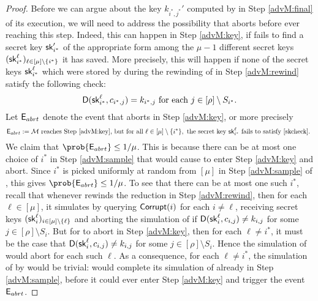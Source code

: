 \begin{proof}
  Before we can argue about the key \(k_{i^{*},j^{*}}'\) computed by
  \redM in Step \ref{advM:final} of its execution,
  we will need to address the possibility that \redM aborts
  before ever reaching this step.
  Indeed, this can happen in Step \ref{advM:key},
  if \redM fails to find a secret key \(\mathsf{sk}_{i^{*}}'\)
  of the appropriate form among the \(\mu - 1\)
  different secret keys \((\mathsf{sk}_{i^{*}}^{\ell})_{\ell \in [\mu] \setminus \{i^{*}\}}\) it has saved.
  More precisely, this will happen if
  none of the secret keys \(\mathsf{sk}_{i^{*}}^{\ell}\)
  which were stored by \redM during the rewinding of \redR in Step \ref{advM:rewind}
  satisfy the following check:
  \begin{equation}\label{skcheck}
  \mathsf{D}(\mathsf{sk}_{i^{*}}^{\ell},c_{i^{*},j}) = k_{i^{*},j}
  \text{ for each } j \in [\rho] \setminus S_{i^{*}}.
  \end{equation}
  Let \(\mathsf{E}_{abrt}\) denote the event that \redM aborts in Step \ref{advM:key}, or more precisely
  \[
    \eventE_{abrt} := \text{\redM reaches Step \ref{advM:key}, but for all } \ell \in [\mu] \setminus \{i^{*}\},
    \text{ the secret key } \sk_{i^{*}}^{\ell}
    \text{ fails to satisfy \eqref{skcheck}. }
  \]
  We claim that \(\prob{\eventE_{abrt}} \le 1/\mu\).
  This is because there can be at most one choice of \(i^{*}\)
  in Step \ref{advM:sample} that would cause \redM to enter Step \ref{advM:key} and abort.
  Since \(i^{*}\) is picked uniformly at random from \([\mu]\) in Step \ref{advM:sample} of \redM,
  this gives \(\prob{\eventE_{abrt}} \le 1/\mu\).
  To see that there can be at most one such \(i^{*}\),
  recall that whenever \redM rewinds the reduction \redR
  in Step \ref{advM:rewind},
  then for each \(\ell \in [\mu]\),
  it simulates \advA by querying \(\mathsf{Corrupt}(i)\) for each \(i \ne \ell\),
  receiving secret keys \((\mathsf{sk}_{i}^{\ell})_{i \in [\mu] \setminus \{\ell\}}\)
  and aborting the simulation of \advA if
  \(\mathsf{D}(\mathsf{sk}_{i}^{\ell},c_{i,j}) \ne k_{i,j}\) for some \(j \in [\rho] \setminus S_{i}\).
  But for \redM to abort in Step \ref{advM:key},
  then for each \(\ell \ne i^{*}\),
  it must be the case that
  \(\mathsf{D}(\mathsf{sk}_{i}^{\ell},c_{i,j}) \ne k_{i,j}\) for some \(j \in [\rho] \setminus S_{i}\).
  Hence the simulation of \advA would abort for each such \(\ell\).
  As a consequence, for each \(\ell \ne i^{*}\), the simulation of \advA by \redM would be trivial:
  \redM would complete its simulation of \advA already in Step \ref{advM:sample},
  before it could ever enter Step \ref{advM:key} and trigger the event \(\mathsf{E}_{abrt}\).


\end{proof}
